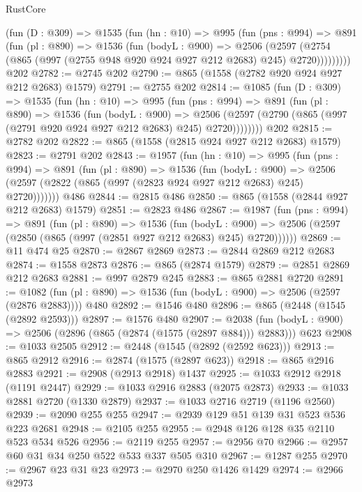 \begin{lexlean}{RustCore}
\begin{coremodule}
      (fun (D : @309) =>
      @1535
        (fun (hn : @10) =>
        @995
          (fun (pns : @994) =>
          @891
            (fun (pl : @890) =>
            @1536
              (fun (bodyL : @900) =>
              @2506
                (@2597
                  (@2754 (@865 (@997 (@2755 @948 @920 @924 @927 @212 @2683) @245) @2720)))))))))
    @202
@2782 := @2745 @202
@2790 := @865 (@1558 (@2782 @920 @924 @927 @212 @2683) @1579)
@2791 := @2755 @202
@2814 := @1085
    (fun (D : @309) =>
    @1535
      (fun (hn : @10) =>
      @995
        (fun (pns : @994) =>
        @891
          (fun (pl : @890) =>
          @1536
            (fun (bodyL : @900) =>
            @2506 (@2597 (@2790 (@865 (@997 (@2791 @920 @924 @927 @212 @2683) @245) @2720))))))))
    @202
@2815 := @2782 @202
@2822 := @865 (@1558 (@2815 @924 @927 @212 @2683) @1579)
@2823 := @2791 @202
@2843 := @1957
    (fun (hn : @10) =>
    @995
      (fun (pns : @994) =>
      @891
        (fun (pl : @890) =>
        @1536
          (fun (bodyL : @900) =>
          @2506 (@2597 (@2822 (@865 (@997 (@2823 @924 @927 @212 @2683) @245) @2720)))))))
    @486
@2844 := @2815 @486
@2850 := @865 (@1558 (@2844 @927 @212 @2683) @1579)
@2851 := @2823 @486
@2867 := @1987
    (fun (pns : @994) =>
    @891
      (fun (pl : @890) =>
      @1536
        (fun (bodyL : @900) =>
        @2506 (@2597 (@2850 (@865 (@997 (@2851 @927 @212 @2683) @245) @2720))))))
@2869 := @11 @474 @25
@2870 := @2867 @2869
@2873 := @2844 @2869 @212 @2683
@2874 := @1558 @2873
@2876 := @865 (@2874 @1579)
@2879 := @2851 @2869 @212 @2683
@2881 := @997 @2879 @245
@2883 := @865 @2881 @2720
@2891 := @1082 (fun (pl : @890) => @1536 (fun (bodyL : @900) => @2506 (@2597 (@2876 @2883)))) @480
@2892 := @1546 @480
@2896 := @865 (@2448 (@1545 (@2892 @2593)))
@2897 := @1576 @480
@2907 := @2038 (fun (bodyL : @900) => @2506 (@2896 (@865 (@2874 (@1575 (@2897 @884))) @2883))) @623
@2908 := @1033 @2505
@2912 := @2448 (@1545 (@2892 (@2592 @623)))
@2913 := @865 @2912
@2916 := @2874 (@1575 (@2897 @623))
@2918 := @865 @2916 @2883
@2921 := @2908 (@2913 @2918) @1437
@2925 := @1033 @2912 @2918 (@1191 @2447)
@2929 := @1033 @2916 @2883 (@2075 @2873)
@2933 := @1033 @2881 @2720 (@1330 @2879)
@2937 := @1033 @2716 @2719 (@1196 @2560)
@2939 := @2090 @255 @255
@2947 := @2939 @129 @51 @139 @31 @523 @536 @223 @2681
@2948 := @2105 @255
@2955 := @2948 @126 @128 @35 @2110 @523 @534 @526
@2956 := @2119 @255
@2957 := @2956 @70
@2966 := @2957 @60 @31 @34 @250 @522 @533 @337 @505 @310
@2967 := @1287 @255
@2970 := @2967 @23 @31 @23
@2973 := @2970 @250 @1426 @1429
@2974 := @2966 @2973

\end{coremodule}
\end{lexlean}
